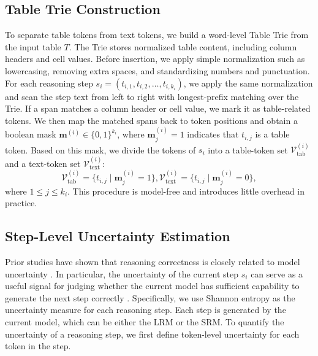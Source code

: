 \documentclass[11pt]{article}
\begin{document}
\subsection{Table Trie Construction}
\vspace{-3pt}
\label{sec:3.2}
To separate table tokens from text tokens, we build a word-level Table Trie from the input table $T$. The Trie stores normalized table content, including column headers and cell values. Before insertion, we apply simple normalization such as lowercasing, removing extra spaces, and standardizing numbers and punctuation. For each reasoning step $s_i = (t_{i,1}, t_{i,2}, \dots, t_{i,k_i})$, we apply the same normalization and scan the step text from left to right with longest-prefix matching over the Trie. If a span matches a column header or cell value, we mark it as table-related tokens. We then map the matched spans back to token positions and obtain a boolean mask $\mathbf{m}^{(i)} \in \{0,1\}^{k_i}$, where $\mathbf{m}^{(i)}_j = 1$ indicates that $t_{i,j}$ is a table token. Based on this mask, we divide the tokens of $s_i$ into a table-token set $\mathcal{V}_{\text{tab}}^{(i)}$ and a text-token set $\mathcal{V}_{\text{text}}^{(i)}$:
\begin{equation}
\mathcal{V}_{\text{tab}}^{(i)} = \{ t_{i,j} \mid \mathbf{m}^{(i)}_j = 1 \},
\mathcal{V}_{\text{text}}^{(i)} = \{ t_{i,j} \mid \mathbf{m}^{(i)}_j = 0 \},
\end{equation}
where $1 \leq j \leq k_i$. This procedure is model-free and introduces little overhead in practice.

\subsection{Step-Level Uncertainty Estimation}
\label{sec:3.3}
Prior studies have shown that reasoning correctness is closely related to model uncertainty \citep{xie2023selfevaluation,wang2024chain}. In particular, the uncertainty of the current step $s_i$ can serve as a useful signal for judging whether the current model has sufficient capability to generate the next step correctly \citep{lee2025confidence}. Specifically, we use Shannon entropy \citep{shannon1948mathematical} as the uncertainty measure for each reasoning step. Each step is generated by the current model, which can be either the LRM or the SRM. To quantify the uncertainty of a reasoning step, we first define token-level uncertainty for each token in the step.
\end{document}
